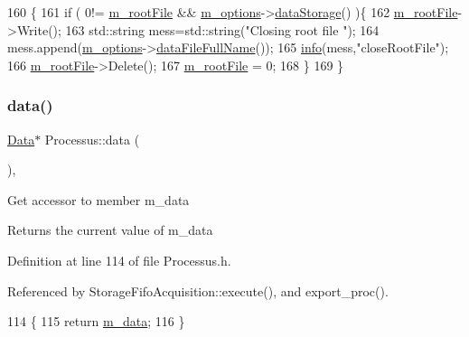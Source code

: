 \begin{DoxyCode}
160                                 \{
161   \textcolor{keywordflow}{if} ( 0!= \hyperlink{classProcessus_a76114f8cf2111e910c323a7ae05a015d}{m\_rootFile} && \hyperlink{classProcessus_a74205f3c1e00c4448f7b3257c2351797}{m\_options}->\hyperlink{classOptions_aed7799d10139fa542055b982cb820192}{dataStorage}() )\{
162     \hyperlink{classProcessus_a76114f8cf2111e910c323a7ae05a015d}{m\_rootFile}->Write();
163         std::string mess=std::string(\textcolor{stringliteral}{"Closing root file "});
164         mess.append(\hyperlink{classProcessus_a74205f3c1e00c4448f7b3257c2351797}{m\_options}->\hyperlink{classOptions_ab1cd9f237e9c18fd72323c74565453f8}{dataFileFullName}());
165         \hyperlink{classObject_a644fd329ea4cb85f54fa6846484b84a8}{info}(mess,\textcolor{stringliteral}{"closeRootFile"});
166     \hyperlink{classProcessus_a76114f8cf2111e910c323a7ae05a015d}{m\_rootFile}->Delete();
167     \hyperlink{classProcessus_a76114f8cf2111e910c323a7ae05a015d}{m\_rootFile} = 0;
168   \}
169 \}
\end{DoxyCode}
\mbox{\label{classProcessus_a16e45f329fbce935aeef0ff3cb508228}} 
\subsubsection{\texorpdfstring{data()}{data()}\hspace{0.1cm}{\footnotesize\ttfamily [1/3]}}
{\footnotesize\ttfamily \hyperlink{classData}{Data}$\ast$ Processus\+::data (\begin{DoxyParamCaption}{ }\end{DoxyParamCaption})\hspace{0.3cm}{\ttfamily [inline]}, {\ttfamily [inherited]}}

Get accessor to member m\+\_\+data \begin{DoxyReturn}{Returns}
the current value of m\+\_\+data 
\end{DoxyReturn}


Definition at line 114 of file Processus.\+h.



Referenced by Storage\+Fifo\+Acquisition\+::execute(), and export\+\_\+proc().


\begin{DoxyCode}
114               \{
115     \textcolor{keywordflow}{return} \hyperlink{classProcessus_a3da9a9de8af54e2f47807a3e09dfccff}{m\_data};
116   \}
\end{DoxyCode}
\mbox{\label{classProcessus_aa7c57483cf4b9ab0b2d0ae2de8316402}} 
